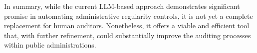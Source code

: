 \documentclass[../main.tex]{subfiles}
\begin{document}
\bigskip

\noindent In summary, while the current LLM-based approach demonstrates significant promise in automating administrative regularity controls, it is not yet a complete replacement for human auditors. Nonetheless, it offers a viable and efficient tool that, with further refinement, could substantially improve the auditing processes within public administrations.
\end{document}
